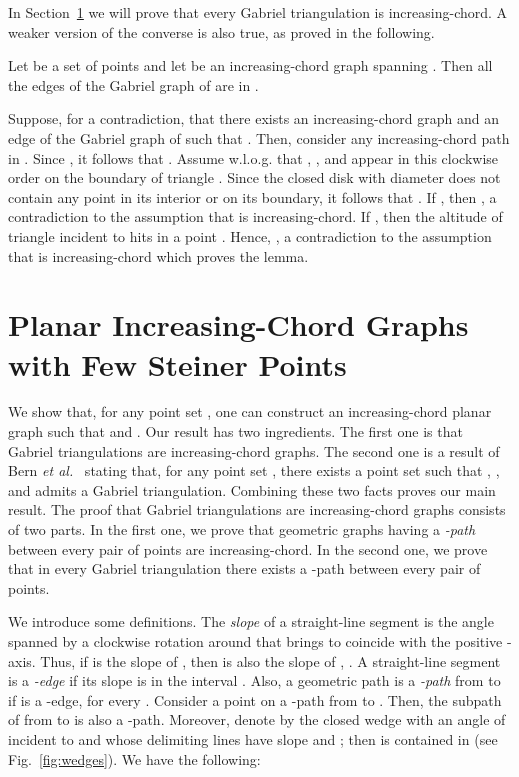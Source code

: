 \documentclass{llncs}
\renewenvironment{proof}
{{\bf Proof:}}{\hspace*{\fill}\par\vspace{2mm}}
\begin{document}
In Section~\ref{se:steiner} we will prove that every Gabriel triangulation is increasing-chord. A weaker version of the converse is also true, as proved in the following.

\begin{lemma} \label{lemma:gabriel_edge_increasing_chord}
Let  be a set of points and let  be an increasing-chord graph spanning . Then all the edges of the Gabriel graph of  are in .
\end{lemma}

\begin{proof}
Suppose, for a contradiction, that there exists an increasing-chord graph  and an edge  of the Gabriel graph of  such that . Then, consider any increasing-chord path  in . Since , it follows that . Assume w.l.o.g. that , , and  appear in this clockwise order on the boundary of triangle . Since the closed disk with diameter  does not contain any point in its interior or on its boundary, it follows that . If , then , a contradiction to the assumption that  is increasing-chord. If , then the altitude of triangle  incident to  hits  in a point . Hence, , a contradiction to the assumption that  is increasing-chord which proves the lemma.
\end{proof}

\section{Planar Increasing-Chord Graphs with Few Steiner Points} \label{se:steiner}

We show that, for any point set , one can construct an increasing-chord planar graph  such that  and . Our result has two ingredients. The first one is that Gabriel triangulations are increasing-chord graphs. The second one is a result of Bern {\em et al.}~\cite{beg-pgmg-94} stating that, for any point set , there exists a point set  such that , , and  admits a Gabriel triangulation. Combining these two facts proves our main result. The proof that Gabriel triangulations are increasing-chord graphs consists of two parts. In the first one, we prove that geometric graphs having a {\em -path} between every pair of points are increasing-chord. In the second one, we prove that in every Gabriel triangulation there exists a -path between every pair of points.


We introduce some definitions. The {\em slope} of a straight-line segment  is the angle spanned by a clockwise rotation around  that brings  to coincide with the positive -axis. Thus, if  is the slope of , then  is also the slope of , . A straight-line segment  is a {\em -edge} if its slope is in the interval . Also, a geometric path  is a {\em -path} from  to  if  is a -edge, for every . Consider a point  on a -path  from  to . Then, the subpath  of  from  to  is also a -path. Moreover, denote by  the closed wedge with an angle of  incident to  and whose delimiting lines have slope  and ; then  is contained in  (see Fig.~\ref{fig:wedges}). We have the following:
\end{document}
